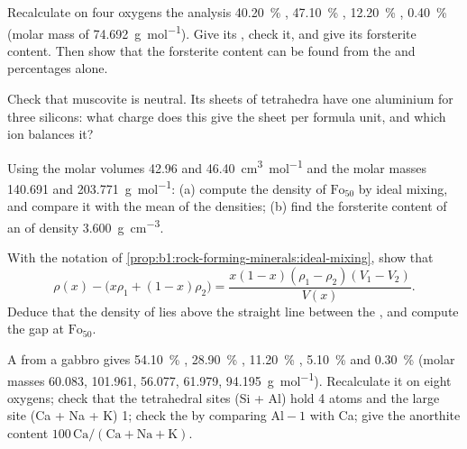 \begin{exercise}[$\star\star$]\label{exo:b1:rock-forming-minerals:7}
Recalculate on four oxygens the  analysis \qty{40.20}{\percent}
, \qty{47.10}{\percent} , \qty{12.20}{\percent} ,
\qty{0.40}{\percent}  (molar mass of 
\qty{74.692}{g.mol^{-1}}).
Give its , check it, and give its forsterite content.
Then show that the forsterite content can be found from the  and
 percentages alone.
\end{exercise}

\begin{exercise}[$\star\star$]\label{exo:b1:rock-forming-minerals:8}
Check that muscovite  is neutral. Its sheets of
tetrahedra have one aluminium for three silicons: what charge does this give
the sheet per formula unit, and which ion balances it?
\end{exercise}

\begin{exercise}[$\star\star$]\label{exo:b1:rock-forming-minerals:9}
Using the molar volumes \num{42.96} and \qty{46.40}{cm^3.mol^{-1}} and the
molar masses \num{140.691} and \qty{203.771}{g.mol^{-1}}: (a) compute the
density of $\text{Fo}_{50}$ by ideal mixing, and compare it with the mean of the
 densities; (b) find the forsterite content of an  of
density \qty{3.600}{g.cm^{-3}}.
\end{exercise}

\begin{exercise}[$\star\star\star$]\label{exo:b1:rock-forming-minerals:10}
With the notation of \cref{prop:b1:rock-forming-minerals:ideal-mixing}, show
that
\[
  \rho(x) - \bigl(x\rho_1 + (1 - x)\rho_2\bigr) =
  \frac{x(1 - x)(\rho_1 - \rho_2)(V_1 - V_2)}{V(x)} .
\]
Deduce that the density of  lies above the straight line between the
, and compute the gap at $\text{Fo}_{50}$.
\end{exercise}

\begin{exercise}[$\star\star\star$]\label{exo:b1:rock-forming-minerals:11}
A  from a gabbro gives \qty{54.10}{\percent} ,
\qty{28.90}{\percent} , \qty{11.20}{\percent} ,
\qty{5.10}{\percent}  and \qty{0.30}{\percent}  (molar
masses \num{60.083}, \num{101.961}, \num{56.077}, \num{61.979},
\qty{94.195}{g.mol^{-1}}). Recalculate it on eight oxygens; check that the
tetrahedral sites (Si + Al) hold 4 atoms and the large site
(Ca + Na + K) 1; check the  by comparing $\mathrm{Al} - 1$
with Ca; give the anorthite content $100\,\mathrm{Ca}/(\mathrm{Ca} +
\mathrm{Na} + \mathrm{K})$.
\end{exercise}

